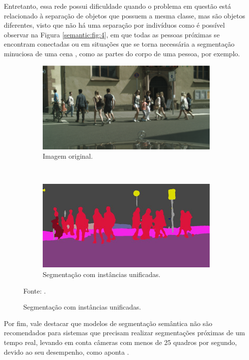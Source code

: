 Entretanto, essa rede possui dificuldade quando o problema em questão está relacionado à separação de objetos que possuem a mesma classe, mas são objetos diferentes, visto que não há uma separação por indivíduos \cite{Kirillov2019a} como é possível observar na Figura \ref{semantic:fig:4}, em que todas as pessoas próximas se encontram conectadas ou em situações que se torna necessária a segmentação minuciosa de uma cena \cite{Ghosh2019}, como as partes do corpo de uma pessoa, por exemplo.

\begin{figure}[H]
   \caption{Exemplo de segmentação semântica com instâncias unificadas.}
   \centering
   \label{semantic:fig:4}
    \begin{subfigure}[t]{0.6\textwidth}
        \centering
        \includegraphics[width=1\linewidth]{recursos/imagens/semantic/sema_ori.png}
        \caption{Imagem original.}
        \label{semantic:fig:4.1}
    \end{subfigure}%
    ~ 

    \begin{subfigure}[t]{0.6\textwidth}
        \centering
        \includegraphics[width=1\linewidth]{recursos/imagens/semantic/sema_unified.png}
        \caption{Segmentação com instâncias unificadas.}
        \label{semantic:fig:4.2}
    \end{subfigure}%

    Fonte: \cite{Fischer2017}.
\end{figure}

Por fim, vale destacar que modelos de segmentação semântica não são recomendados para sistemas que precisam realizar segmentações próximas de um tempo real, levando em conta câmeras com menos de 25 quadros por segundo, devido ao seu desempenho, como aponta \cite{Minaee2021}.